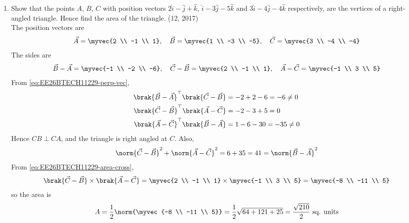 \begin{enumerate}[label=\thesubsection.\arabic*, ref=\thesubsection.\theenumi]
\item 
Show that the points $A$, $B$, $C$ with position vectors $2\hat{i} - \hat{j} + \hat{k}$, $\hat{i} - 3\hat{j} - 5\hat{k}$ and $3\hat{i} - 4\hat{j} - 4\hat{k}$ respectively, are the vertices of a right-angled triangle. Hence find the area of the triangle.
\hfill (12, 2017)
\\
\solution
The position vectors are
\begin{align}
	\vec{A} = \myvec{2 \\ -1 \\ 1}, \quad \vec{B} = \myvec{1 \\ -3 \\ -5}, \quad \vec{C} = \myvec{3 \\ -4 \\ -4}
\end{align}
The sides are
\begin{align}
	\vec{B} - \vec{A} = \myvec{-1 \\ -2 \\ -6}, \quad \vec{C} - \vec{B} = \myvec{2 \\ -1 \\ 1}, \quad \vec{A} - \vec{C} = \myvec{-1 \\ 3 \\ 5}
\end{align}
From \eqref{eq:EE26BTECH11229-perp-vec},
\begin{align}
	\brak{\vec{B}-\vec{A}}^{\top}\brak{\vec{C}-\vec{B}} &= -2 + 2 - 6 = -6 \neq 0
	\\
	\brak{\vec{C}-\vec{B}}^{\top}\brak{\vec{A}-\vec{C}} &= -2 - 3 + 5 = 0
	\\
	\brak{\vec{A}-\vec{C}}^{\top}\brak{\vec{B}-\vec{A}} &= 1 - 6 - 30 = -35 \neq 0
\end{align}
Hence $CB \perp CA$, and the triangle is right angled at $C$. Also,
\begin{align}
	\norm{\vec{C}-\vec{B}}^2 + \norm{\vec{A}-\vec{C}}^2 = 6 + 35 = 41 = \norm{\vec{B}-\vec{A}}^2
\end{align}
From \eqref{eq:EE26BTECH11229-area-cross},
\begin{align}
	\brak{\vec{C}-\vec{B}}\times\brak{\vec{A}-\vec{C}} = \myvec{2 \\ -1 \\ 1}\times\myvec{-1 \\ 3 \\ 5} = \myvec{-8 \\ -11 \\ 5}
\end{align}
so the area is
\begin{align}
	A = \frac{1}{2}\norm{\myvec{-8 \\ -11 \\ 5}} = \frac{1}{2}\sqrt{64 + 121 + 25} = \frac{\sqrt{210}}{2} \text{ sq. units}
\end{align}


\end{enumerate}
